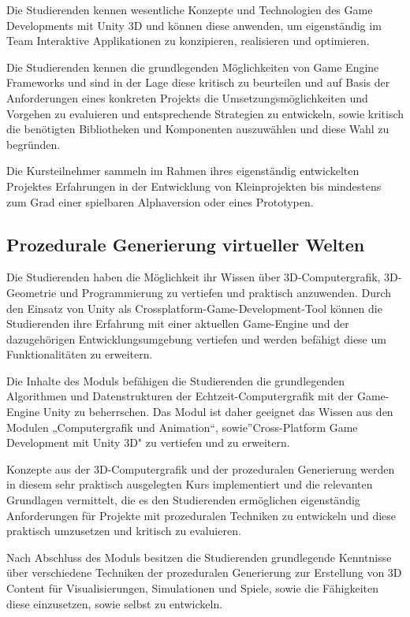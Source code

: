 Die Studierenden kennen wesentliche Konzepte und Technologien des Game
Developments mit Unity 3D und können diese anwenden, um eigenständig im
Team Interaktive Applikationen zu konzipieren, realisieren und
optimieren.

Die Studierenden kennen die grundlegenden Möglichkeiten von Game Engine
Frameworks und sind in der Lage diese kritisch zu beurteilen und auf
Basis der Anforderungen eines konkreten Projekts die
Umsetzungsmöglichkeiten und Vorgehen zu evaluieren und entsprechende
Strategien zu entwickeln, sowie kritisch die benötigten Bibliotheken und
Komponenten auszuwählen und diese Wahl zu begründen.

Die Kursteilnehmer sammeln im Rahmen ihres eigenständig entwickelten
Projektes Erfahrungen in der Entwicklung von Kleinprojekten bis
mindestens zum Grad einer spielbaren Alphaversion oder eines Prototypen.

\subsection{Prozedurale Generierung virtueller
Welten}\label{prozedurale-generierung-virtueller-welten}

Die Studierenden haben die Möglichkeit ihr Wissen über
3D-Computergrafik, 3D-Geometrie und Programmierung zu vertiefen und
praktisch anzuwenden. Durch den Einsatz von Unity als
Crossplatform-Game-Development-Tool können die Studierenden ihre
Erfahrung mit einer aktuellen Game-Engine und der dazugehörigen
Entwicklungsumgebung vertiefen und werden befähigt diese um
Funktionalitäten zu erweitern.

Die Inhalte des Moduls befähigen die Studierenden die grundlegenden
Algorithmen und Datenstrukturen der Echtzeit-Computergrafik mit der
Game-Engine Unity zu beherrschen. Das Modul ist daher geeignet das
Wissen aus den Modulen „Computergrafik und Animation``,
sowie''Cross-Platform Game Development mit Unity 3D" zu vertiefen und zu
erweitern.

Konzepte aus der 3D-Computergrafik und der prozeduralen Generierung
werden in diesem sehr praktisch ausgelegten Kurs implementiert und die
relevanten Grundlagen vermittelt, die es den Studierenden ermöglichen
eigenständig Anforderungen für Projekte mit prozeduralen Techniken zu
entwickeln und diese praktisch umzusetzen und kritisch zu evaluieren.

Nach Abschluss des Moduls besitzen die Studierenden grundlegende
Kenntnisse über verschiedene Techniken der prozeduralen Generierung zur
Erstellung von 3D Content für Visualisierungen, Simulationen und Spiele,
sowie die Fähigkeiten diese einzusetzen, sowie selbst zu entwickeln.

